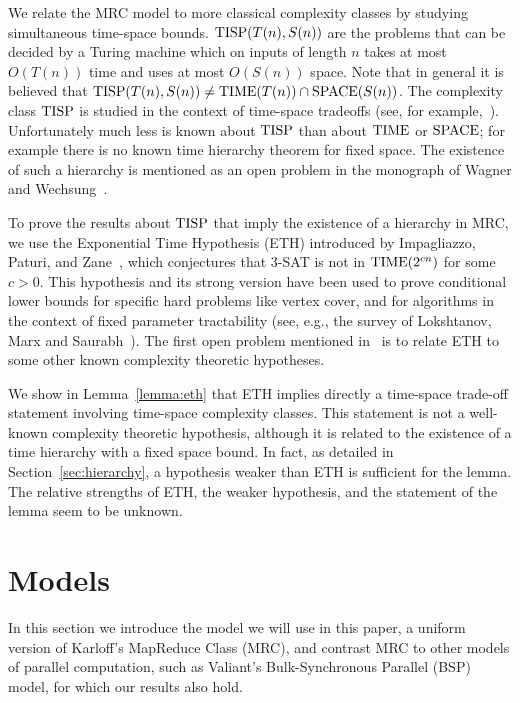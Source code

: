 \documentclass{llncs}
\newcommand{\SPACE}{\textup{SPACE}}
\newcommand{\TIME}{\textup{TIME}}
\newcommand{\TISP}{\textup{TISP}}
\begin{document}
We relate the MRC model to more classical complexity classes by studying simultaneous time-space bounds. $\TISP(T(n),S(n))$ are the problems that
can be decided by a Turing machine which on inputs of length $n$ takes at most
$O(T(n))$ time and uses at most $O(S(n))$ space. Note that in general it is
believed that $\TISP(T(n), S(n)) \neq \TIME(T(n)) \cap \SPACE(S(n))$.  The
complexity class $\TISP$ is studied in the context of time-space tradeoffs
(see, for example,~\cite{Fortnow00,Williams08}). Unfortunately much less is
known about $\TISP$ than about $\TIME$ or $\SPACE$; for example there is no
known time hierarchy theorem for fixed space. The existence of such a hierarchy
is mentioned as an open problem in the monograph of Wagner and
Wechsung~\cite{WagnerW86}.

To prove the results about $\TISP$ that imply the existence of a hierarchy in
MRC, we use the Exponential Time Hypothesis (ETH) introduced by Impagliazzo,
Paturi, and Zane~\cite{ImpagliazzoP99,ImpagliazzoPZ01}, which conjectures that
3-SAT is not in $\TIME(2^{cn})$ for some $c>0$. This hypothesis and its strong
version have been used to prove conditional lower bounds for specific hard
problems like vertex cover, and for algorithms in the context of fixed
parameter tractability (see, e.g., the survey of Lokshtanov, Marx and
Saurabh~\cite{LokshtanovMS11}). The first open problem mentioned
in~\cite{LokshtanovMS11} is to relate ETH to some other known complexity
theoretic hypotheses.

We show in Lemma~\ref{lemma:eth} that ETH implies directly a time-space
trade-off statement involving time-space complexity classes. This statement is
not a well-known complexity theoretic hypothesis, although it is related to the
existence of a time hierarchy with a fixed space bound. In fact, as detailed in
Section~\ref{sec:hierarchy}, a hypothesis weaker than ETH is sufficient for the
lemma. The relative strengths of ETH, the weaker hypothesis, and the statement
of the lemma seem to be unknown.

\section{Models} \label{sec:definition}

In this section we introduce the model we will use in this paper, a uniform
version of Karloff's MapReduce Class (MRC), and contrast MRC to other models of
parallel computation, such as Valiant's Bulk-Synchronous Parallel (BSP) model,
for which our results also hold.
\end{document}
